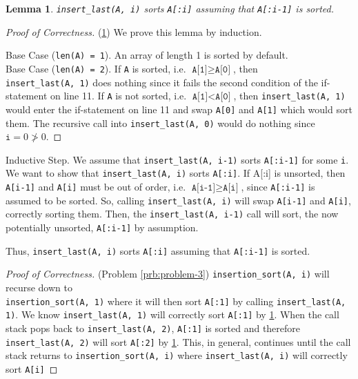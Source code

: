 \documentclass[11pt]{article}
\newcounter{problem}
\newtheorem{lemma}{Lemma}[problem]
\theoremstyle{claim}
\begin{document}
\begin{lemma}\label{lem:insert_last-sort}
    \texttt{insert\_last(A, i)} sorts \texttt{A[:i]} assuming that \texttt{A[:i-1]} is sorted.
\end{lemma}
\begin{proof}[Proof of Correctness]{(\cref{lem:insert_last-sort})}
\noindent
We prove this lemma by induction.

\noindent
Base Case (\texttt{len(A) = 1}). An array of length 1 is sorted by default.\\
Base Case (\texttt{len(A) = 2}). If \texttt{A} is sorted, i.e. \(\texttt{A[1]} \geq \texttt{A[0]}\), then\\ \texttt{insert\_last(A, 1)} does nothing since it fails the second condition of the if-statement on line 11. If \texttt{A} is not sorted, i.e. \(\texttt{A[1]} < \texttt{A[0]}\), then \texttt{insert\_last(A, 1)} would enter the if-statement on line 11 and swap \texttt{A[0]} and \texttt{A[1]} which would sort them. The recursive call into \texttt{insert\_last(A, 0)} would do nothing since \(\texttt{i} = 0 \not> 0\).
\end{proof}

\noindent
Inductive Step. We assume that \texttt{insert\_last(A, i-1)} sorts \texttt{A[:i-1]} for some \texttt{i}. We want to show that \texttt{insert\_last(A, i)} sorts \texttt{A[:i]}. If A[:i] is unsorted, then \texttt{A[i-1]} and \texttt{A[i]} must be out of order, i.e. \(\texttt{A[i-1]} \geq \texttt{A[i]}\), since \texttt{A[:i-1]} is assumed to be sorted. So, calling \texttt{insert\_last(A, i)} will swap \texttt{A[i-1]} and \texttt{A[i]}, correctly sorting them. Then, the \texttt{insert\_last(A, i-1)} call will sort, the now potentially unsorted, \texttt{A[:i-1]} by assumption.

\noindent
Thus, \texttt{insert\_last(A, i)} sorts \texttt{A[:i]} assuming that \texttt{A[:i-1]} is sorted.

\begin{proof}[Proof of Correctness]{(Problem \ref{prb:problem-3})}
\noindent
\texttt{insertion\_sort(A, i)} will recurse down to\\\texttt{insertion\_sort(A, 1)} where it will then sort \texttt{A[:1]} by calling \texttt{insert\_last(A, 1)}. We know \texttt{insert\_last(A, 1)} will correctly sort \texttt{A[:1]} by \cref{lem:insert_last-sort}. When the call stack pops back to \texttt{insert\_last(A, 2)}, \texttt{A[:1]} is sorted and therefore \texttt{insert\_last(A, 2)} will sort \texttt{A[:2]} by \cref{lem:insert_last-sort}. This, in general, continues until the call stack returns to \texttt{insertion\_sort(A, i)} where \texttt{insert\_last(A, i)} will correctly sort \texttt{A[i]}
\end{proof}
\end{document}
